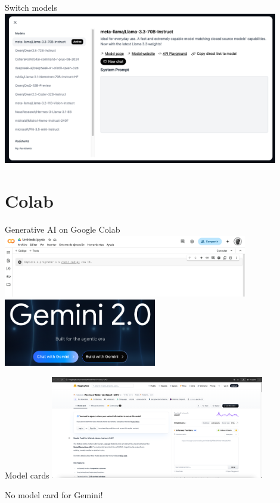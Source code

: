 \documentclass[t,xcolor={dvipsnames},final,aspectratio=169]{beamer}
\begin{document}
\begin{frame}{Switch models}
\includegraphics[width=0.9\textwidth]{models.png}
\end{frame}

\section{Colab}
{
\begin{frame}{Generative AI on Google Colab}
\includegraphics[width=0.8\textwidth]{colab.png}
\pause
\vfill
\includegraphics[width=0.5\textwidth]{gemini.png}
\end{frame}
}

\begin{frame}{Model cards}
\includegraphics[width=0.7\textwidth]{modelcard.png}
\pause

No model card for Gemini!
\end{frame}
\end{document}
